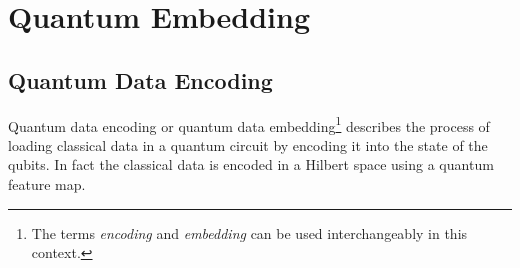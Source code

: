 
\chapter{Quantum Embedding}
\label{chapter:quantum_embedding} %






\section{Quantum Data Encoding}\label{section:quantum_data_encoding}
Quantum data encoding or quantum data embedding\footnote{The terms \textit{encoding} and \textit{embedding} can be used interchangeably in this context.} describes the process of loading classical data in a quantum circuit by encoding it into the state of the qubits. In fact the classical data is encoded in a Hilbert space using a quantum feature map. 

